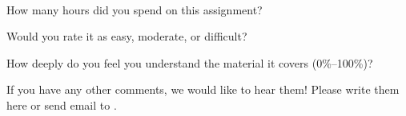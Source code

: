 \documentclass[11pt]{article}
\begin{document}
\begin{debriefing} \hfill\\[-4ex]
\begin{enumerate*}
\item How many hours did you spend on this assignment? 
\item Would you rate it as easy, moderate, or difficult? 
\item How deeply do you feel you understand the material it covers (0\%–100\%)? 
\item If you have any other comments, we would like to hear them!
  Please write them here or send email to
  .
\end{enumerate*}
\end{debriefing}
\end{document}
